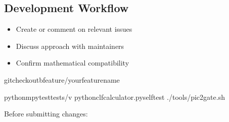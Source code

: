 \documentclass[letterpaper,10pt,english]{sphinxmanual}
\begin{document}
\subsection{Development Workflow}
\label{\detokenize{contributing:development-workflow}}
\sphinxAtStartPar
{}
\begin{itemize}
\item {} 
\sphinxAtStartPar
Create or comment on relevant issues

\item {} 
\sphinxAtStartPar
Discuss approach with maintainers

\item {} 
\sphinxAtStartPar
Confirm mathematical compatibility

\end{itemize}

\sphinxAtStartPar
{}

\begin{sphinxVerbatim}[commandchars=\\\{\}]
gitcheckout\PYGZhy{}bfeature/your\PYGZhy{}feature\PYGZhy{}name


python\PYGZhy{}mpytesttests/\PYGZhy{}v
pythonclf\PYGZus{}calculator.py\PYGZhy{}\PYGZhy{}self\PYGZhy{}test
./tools/pic2\PYGZus{}gate.sh
\end{sphinxVerbatim}

\sphinxAtStartPar
{}

\sphinxAtStartPar
Before submitting changes:
\end{document}
